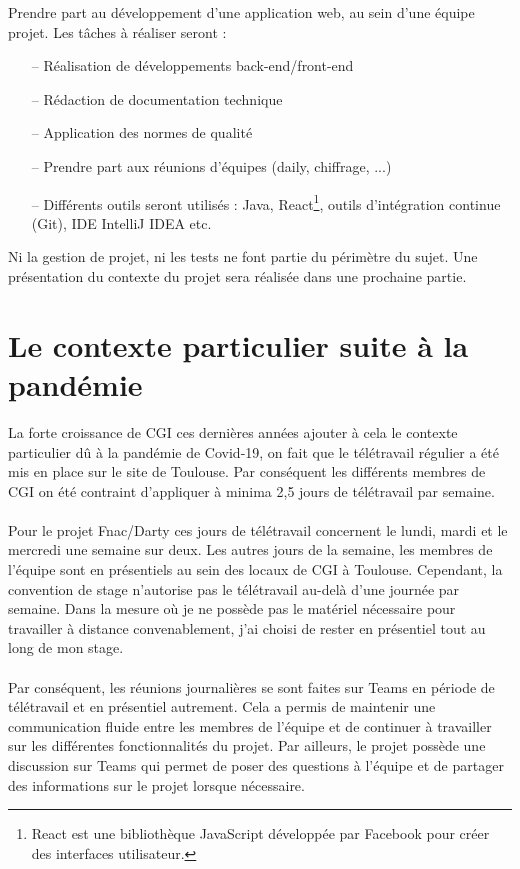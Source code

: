 \documentclass[12pt, a4paper]{report}
\begin{document}
	\flqq{} Prendre part au développement d'une application web, au sein d'une équipe projet. Les tâches à réaliser seront :
	\begin{itemize}
		\item[–] Réalisation de développements back-end/front-end
		\item[–] Rédaction de documentation technique
		\item[–] Application des normes de qualité
		\item[–] Prendre part aux réunions d'équipes (daily, chiffrage, ...)
		\item[–] Différents outils seront utilisés : Java, React\footnote{React est une bibliothèque JavaScript développée par Facebook pour créer des interfaces utilisateur.}, outils d'intégration continue (Git), IDE IntelliJ IDEA etc. \frqq{}
	\end{itemize}
	\vspace{0.5cm}
	\noindent
	Ni la gestion de projet, ni les tests ne font partie du périmètre du sujet. Une présentation du contexte du projet sera réalisée dans une prochaine partie.

	\section{Le contexte particulier suite à la pandémie}

	La forte croissance de CGI ces dernières années ajouter à cela le contexte particulier dû à la pandémie de Covid-19, on fait que le télétravail régulier a été mis en place sur le site de Toulouse. Par conséquent les différents membres de CGI on été contraint d'appliquer à minima 2,5 jours de télétravail par semaine.
	\\\\
	Pour le projet Fnac/Darty ces jours de télétravail concernent le lundi, mardi et le mercredi une semaine sur deux. Les autres jours de la semaine, les membres de l'équipe sont en présentiels au sein des locaux de CGI à Toulouse. Cependant, la convention de stage n'autorise pas le télétravail au-delà d'une journée par semaine. Dans la mesure où je ne possède pas le matériel nécessaire pour travailler à distance convenablement, j'ai choisi de rester en présentiel tout au long de mon stage.
	\\\\
	Par conséquent, les réunions journalières se sont faites sur Teams en période de télétravail et en présentiel autrement. Cela a permis de maintenir une communication fluide entre les membres de l'équipe et de continuer à travailler sur les différentes fonctionnalités du projet. Par ailleurs, le projet possède une discussion sur Teams qui permet de poser des questions à l'équipe et de partager des informations sur le projet lorsque nécessaire.
\end{document}
